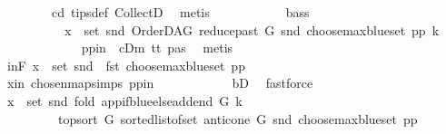 \begin{isabellebody}
\ \ \ \ \ \ \ \ cd{}\ tips{\isacharunderscore}{\kern0pt}def\ CollectD\ \isamarkupfalse%
\ metis\isanewline
\ \ \ \ \ \ \ \ \isamarkupfalse%
\ \isamarkupfalse%
\ bass{\isacharcolon}{\kern0pt}\ \isanewline
\ \ \ \ \ \ \ \ \ \ {\isachardoublequoteopen}x\ {\isasymin}\ set\ {\isacharparenleft}{\kern0pt}{\isacharparenleft}{\kern0pt}snd\ {\isacharparenleft}{\kern0pt}OrderDAG\ {\isacharparenleft}{\kern0pt}reduce{\isacharunderscore}{\kern0pt}past\ G\ {\isacharparenleft}{\kern0pt}snd\ {\isacharparenleft}{\kern0pt}choose{\isacharunderscore}{\kern0pt}max{\isacharunderscore}{\kern0pt}blue{\isacharunderscore}{\kern0pt}set\ pp{\isacharparenright}{\kern0pt}{\isacharparenright}{\kern0pt}{\isacharparenright}{\kern0pt}\ k{\isacharparenright}{\kern0pt}{\isacharparenright}{\kern0pt}{\isacharparenright}{\kern0pt}{\isachardoublequoteclose}\ \isanewline
\ \ \ \ \ \ \ \ \ \ \isamarkupfalse%
\ \ pp{\isacharunderscore}{\kern0pt}in\ {}\ cDm\ tt{}\ pas\ \isamarkupfalse%
\ metis\isanewline
\ \ \ \ \ \ \ \ \isamarkupfalse%
\ \isamarkupfalse%
\ in{\isacharunderscore}{\kern0pt}F{\isacharcolon}{\kern0pt}\ {\isachardoublequoteopen}x\ {\isasymin}\ set\ {\isacharparenleft}{\kern0pt}snd\ {\isacharparenleft}{\kern0pt}\ fst\ {\isacharparenleft}{\kern0pt}{\isacharparenleft}{\kern0pt}choose{\isacharunderscore}{\kern0pt}max{\isacharunderscore}{\kern0pt}blue{\isacharunderscore}{\kern0pt}set\ pp{\isacharparenright}{\kern0pt}{\isacharparenright}{\kern0pt}{\isacharparenright}{\kern0pt}{\isacharparenright}{\kern0pt}{\isachardoublequoteclose}\ \isanewline
\ \ \ \ \ \ \ \ \ \ \isamarkupfalse%
\ x{\isacharunderscore}{\kern0pt}in\ chosen{\isacharunderscore}{\kern0pt}map{\isacharunderscore}{\kern0pt}simps{\isacharparenleft}{\kern0pt}{}{\isacharparenright}{\kern0pt}\ pp{\isacharunderscore}{\kern0pt}in\isanewline
\ \ \ \ \ \ \ \ \ \ \isamarkupfalse%
\ bD\ \isamarkupfalse%
\ fastforce\ \ \isanewline
\ \ \ \ \ \ \ \ \isamarkupfalse%
\ \isamarkupfalse%
\ {\isachardoublequoteopen}x\ {\isasymin}\ set\ {\isacharparenleft}{\kern0pt}snd\ {\isacharparenleft}{\kern0pt}fold\ {\isacharparenleft}{\kern0pt}app{\isacharunderscore}{\kern0pt}if{\isacharunderscore}{\kern0pt}blue{\isacharunderscore}{\kern0pt}else{\isacharunderscore}{\kern0pt}add{\isacharunderscore}{\kern0pt}end\ G\ k{\isacharparenright}{\kern0pt}\isanewline
\ \ \ \ \ \ \ \ \ {\isacharparenleft}{\kern0pt}top{\isacharunderscore}{\kern0pt}sort\ G\ {\isacharparenleft}{\kern0pt}sorted{\isacharunderscore}{\kern0pt}list{\isacharunderscore}{\kern0pt}of{\isacharunderscore}{\kern0pt}set\ {\isacharparenleft}{\kern0pt}anticone\ G\ {\isacharparenleft}{\kern0pt}snd\ {\isacharparenleft}{\kern0pt}choose{\isacharunderscore}{\kern0pt}max{\isacharunderscore}{\kern0pt}blue{\isacharunderscore}{\kern0pt}set\ pp{\isacharparenright}{\kern0pt}{\isacharparenright}{\kern0pt}{\isacharparenright}{\kern0pt}{\isacharparenright}{\kern0pt}{\isacharparenright}{\kern0pt}\isanewline

\end{isabellebody}
